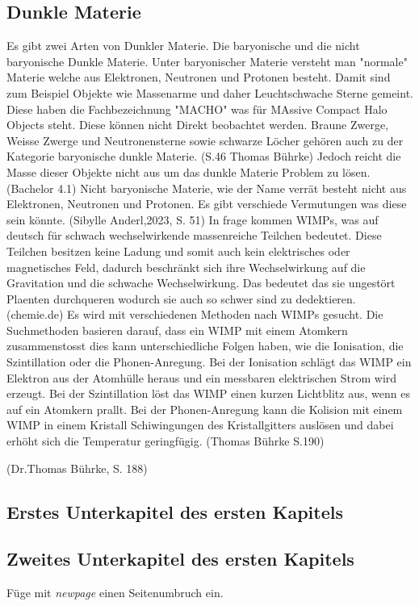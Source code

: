 \subsection{Dunkle Materie} 
Es gibt zwei Arten von Dunkler Materie. Die baryonische und die nicht baryonische Dunkle
Materie. Unter baryonischer Materie versteht man "normale" Materie welche aus Elektronen, Neutronen 
und Protonen besteht. Damit sind zum Beispiel Objekte wie Massenarme und daher Leuchtschwache Sterne
gemeint. Diese haben die Fachbezeichnung "MACHO" was für MAssive Compact Halo Objects steht. Diese können
nicht Direkt beobachtet werden. Braune Zwerge, Weisse Zwerge und Neutronensterne sowie schwarze Löcher gehören auch zu der Kategorie 
baryonische dunkle Materie. (S.46 Thomas Bührke) Jedoch reicht die Masse dieser Objekte nicht aus um das dunkle Materie Problem zu lösen. (Bachelor 4.1) 
Nicht baryonische Materie, wie der Name verrät besteht nicht aus Elektronen, Neutronen und Protonen. Es gibt
verschiede Vermutungen was diese sein könnte. (Sibylle Anderl,2023, S. 51) 
In frage kommen WIMPs, was auf deutsch für schwach wechselwirkende massenreiche Teilchen bedeutet. Diese Teilchen besitzen keine Ladung und somit auch kein elektrisches oder magnetisches Feld, dadurch beschränkt sich ihre 
Wechselwirkung auf die Gravitation und die schwache Wechselwirkung. Das bedeutet das sie ungestört Plaenten durchqueren wodurch sie auch so schwer sind zu dedektieren. (chemie.de)
Es wird mit verschiedenen Methoden nach WIMPs gesucht. Die Suchmethoden basieren darauf, dass ein WIMP mit einem Atomkern zusammenstosst dies kann unterschiedliche Folgen haben, wie die Ionisation, die Szintillation oder die Phonen-Anregung.
Bei der Ionisation schlägt das WIMP ein Elektron aus der Atomhülle heraus und ein messbaren elektrischen Strom wird erzeugt. Bei der Szintillation löst das WIMP einen kurzen Lichtblitz aus,
wenn es auf ein Atomkern prallt. Bei der Phonen-Anregung kann die Kolision mit einem WIMP in einem Kristall Schiwingungen des Kristallgitters auslösen und dabei erhöht sich die Temperatur geringfügig. (Thomas Bührke S.190)

(Dr.Thomas Bührke, S. 188)
\subsection{Erstes Unterkapitel des ersten Kapitels}
\subsection{Zweites Unterkapitel des ersten Kapitels}
Füge mit \textit{newpage} einen Seitenumbruch ein.

